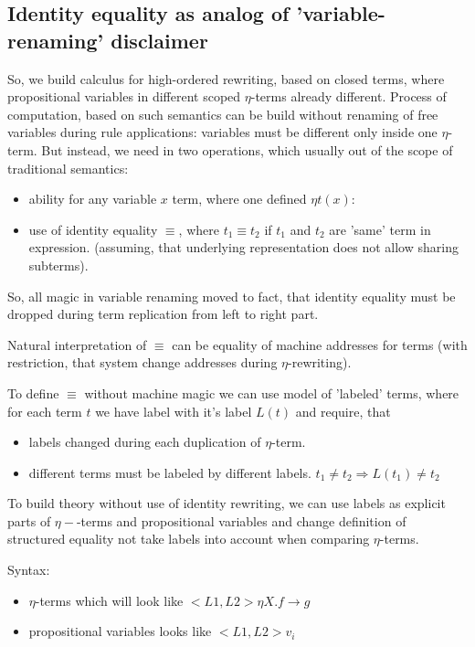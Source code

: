 \documentclass[10pt]{article}
\begin{document}
  
 \subsection{Identity equality as analog of 'variable-renaming' disclaimer }
 
 So, we build calculus for high-ordered rewriting, based on closed terms, where propositional
variables in different scoped $\eta$-terms already different. Process of computation, based
on such semantics can be build without renaming of free variables during rule applications: variables must be different only inside one $\eta$-term.  But instead, we
need in two operations, which usually out of the scope of traditional semantics:
\begin{itemize}
 \item ability for any variable $x$ term, where one defined $\eta t(x)$:
 \item use of identity equality $\equiv$, where $t_{1}\equiv t_{2}$  if $t_1$ and $t_2$ are
  'same' term in expression. (assuming, that underlying representation does not allow sharing subterms). 
\end{itemize}
 So, all magic in variable renaming moved to fact, that identity equality must be dropped during term replication from left to right part.
  
 Natural interpretation of $\equiv$ can be equality of machine addresses for terms (with restriction, that system change addresses during $\eta$-rewriting).
 
To define $\equiv$ without machine magic we can use model of 'labeled' terms, where for
each term $t$ we have label with it's label $L(t)$ and require, that 
\begin{itemize}
  \item labels changed during each duplication of $\eta$-term. 
  \item different terms must be labeled by different labels.
    $t_{1}\not=t_{2} \Rightarrow L(t_1)\not=t_2$
\end{itemize}   

 To build theory without use of identity rewriting, we can use labels as explicit parts of $\eta-$-terms and propositional variables and change definition of structured  equality not take labels into account when comparing $\eta$-terms.
 
Syntax: 
 \begin{itemize}
   \item $\eta$-terms which will look like $<L1,L2>\eta X. f \to g$ 
   \item propositional variables looks like $<L1,L2>v_{i}$
 \end{itemize}  
    
\end{document}

